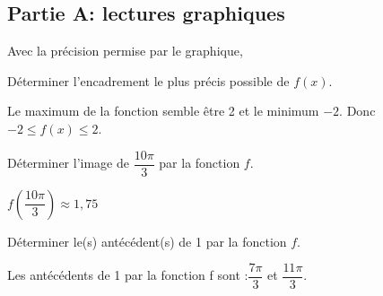 \documentclass[12pt,a4paper]{article}  %
\begin{document}
\subsection*{Partie A: lectures graphiques}
Avec la précision permise par le graphique,

\begin{enumMet}
	\item Déterminer l'encadrement le plus précis possible de $f(x)$.
	\begin{corrBox}
		Le maximum de la fonction semble être 2 et le minimum $-2$. Donc $-2\leqslant f(x)\leqslant 2$.		
	\end{corrBox}
	\item Déterminer l'image de $\dfrac{10 \pi}{3}$ par la fonction $f$.
	\begin{corrBox}
		$f\left(\dfrac{10 \pi}{3}\right)\approx1,75$	
	\end{corrBox}
	\item Déterminer le(s) antécédent(s) de 1 par la fonction $f$.
	\begin{corrBox}
		Les antécédents de 1 par la fonction f sont :$\dfrac{7\pi}{3}$ et $\dfrac{11\pi}{3}$.		
	\end{corrBox}
\end{enumMet}
\end{document}
